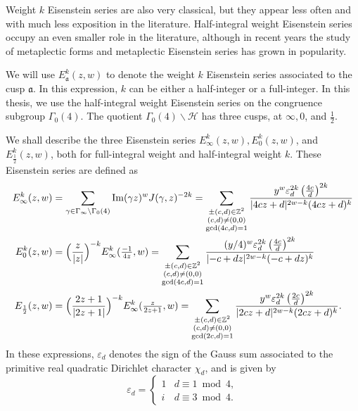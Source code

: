 Weight $k$ Eisenstein series are also very classical, but they appear less often and
with much less exposition in the literature.
Half-integral weight Eisenstein series occupy an even smaller role in the literature,
although in recent years the study of metaplectic forms and metaplectic Eisenstein series
has grown in popularity.


We will use $E_\mathfrak{a}^k(z,w)$ to denote the weight $k$ Eisenstein series associated
to the cusp $\mathfrak{a}$.
In this expression, $k$ can be either a half-integer or a full-integer.
In this thesis, we use the half-integral weight Eisenstein series on the congruence
subgroup $\Gamma_0(4)$.
The quotient $\Gamma_0(4) \backslash \mathcal{H}$ has three cusps, at $\infty, 0$, and
$\frac{1}{2}$.


We shall describe the three Eisenstein series $E^k_\infty(z,w), E^k_0(z,w)$, and
$E^k_{\frac{1}{2}}(z,w)$, both for full-integral weight and half-integral weight $k$.
These Eisenstein series are defined as
\begin{align}
  E_\infty^k(z,w) &= \sum_{\gamma \in \Gamma_\infty \backslash \Gamma_0(4)} \operatorname{Im}(\gamma
  z)^w J(\gamma, z)^{-2k}
  =
  \sum_{\substack{\pm (c,d) \in \mathbb{Z}^2 \\ (c,d) \neq (0,0) \\ \gcd(4c,d) = 1}}
  \frac{y^w \varepsilon_d^{2k} \left(\frac{4c}{d}\right)^{2k}}{\lvert 4cz + d \rvert^{2w-k}(4cz+d)^k}
  \\
  E_0^k(z,w) &= \Big( \frac{z}{\lvert z \rvert} \Big)^{-k} E_\infty^k(\tfrac{-1}{4z}, w)
  =
  \sum_{\substack{\pm(c,d) \in \mathbb{Z}^2 \\ (c,d) \neq (0,0) \\ \gcd(4c, d) = 1}}
  \frac{(y/4)^w \varepsilon_d^{2k} \left(\frac{4c}{d}\right)^{2k}}{\lvert -c + dz \rvert^{2w - k} (-c +
  dz)^k}
  \\
  E_{\frac{1}{2}}(z,w) &= \Big( \frac{2z+1}{\lvert 2z+1 \rvert} \Big)^{-k}
  E_\infty^k(\tfrac{z}{2z+1}, w) =
  \sum_{\substack{\pm(c,d) \in \mathbb{Z}^2 \\ (c,d) \neq (0,0) \\ \gcd(2c, d) = 1}}
  \frac{y^w \varepsilon_d^{2k} \left(\frac{2c}{d}\right)^{2k}}{\lvert 2cz+d \rvert^{2w -
  k}(2cz+d)^k}.
\end{align}
In these expressions, $\varepsilon_d$ denotes the sign of the Gauss sum associated to the
primitive real quadratic Dirichlet character $\chi_d$, and is given by
\begin{equation}
  \varepsilon_d = \begin{cases}
    1 & d \equiv 1 \bmod 4, \\
    i & d \equiv 3 \bmod 4.
  \end{cases}
\end{equation}
